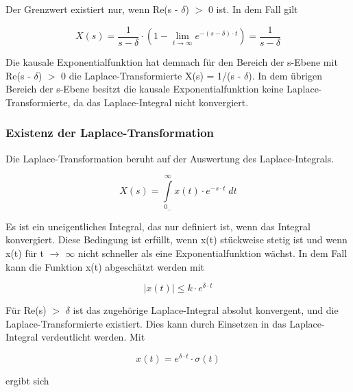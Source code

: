 \noindent Der Grenzwert existiert nur, wenn Re(s - $\delta$) $\mathrm{>}$ 0 ist. In dem Fall gilt

\begin{equation}\label{eq:fourtwentyone}
X\left(s\right)=\frac{1}{s-\delta } \cdot \left(1-\lim\limits_{t\to \infty } e^{-\left(s-\delta \right)\cdot t} \right)=\frac{1}{s-\delta } 
\end{equation}

\noindent Die kausale Exponentialfunktion hat demnach f\"{u}r den Bereich der s-Ebene mit Re(s - $\delta$) $\mathrm{>}$ 0 die Laplace-Transformierte X(s) = 1/(s - $\delta$). In dem \"{u}brigen Bereich der s-Ebene besitzt die kausale Exponentialfunktion keine Laplace-Transformierte, da das Laplace-Integral nicht konvergiert. 

\subsubsection{Existenz der Laplace-Transformation}

\noindent Die Laplace-Transformation beruht auf der Auswertung des Laplace-Integrals.

\begin{equation}\label{eq:fourtwentytwo}
X\left(s\right)=\int\limits _{0_{-} }^{\infty }x\left(t\right)\cdot e^{-s\cdot t} \; dt
\end{equation}

\noindent Es ist ein uneigentliches Integral, das nur definiert ist, wenn das Integral konvergiert. Diese Bedingung ist erfüllt, wenn x(t) stückweise stetig ist und wenn {\textbar}x(t){\textbar} für t $\rightarrow$ $\infty$ nicht schneller als eine Exponentialfunktion wächst. In dem Fall kann die Funktion x(t) abgeschätzt werden mit 

\begin{equation}\label{eq:fourtwentythree}
\left|x\left(t\right)\right|\le k\cdot e^{\delta \cdot t}
\end{equation}

\noindent Für Re(s) $\mathrm{>}$ $\delta$ ist das zugehörige Laplace-Integral absolut konvergent, und die Laplace-Transformierte existiert. Dies kann durch Einsetzen in das Laplace-Integral verdeutlicht werden. Mit 

\begin{equation}\label{eq:fourtwentyfour}
x\left(t\right)=e^{\delta \cdot t} \cdot \sigma \left(t\right)
\end{equation}

\noindent ergibt sich

